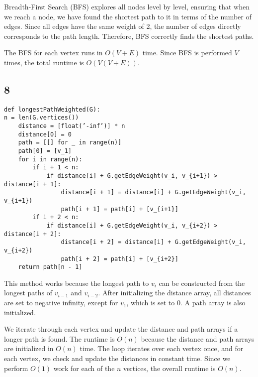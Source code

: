 \documentclass{article}
\begin{document}
Breadth-First Search (BFS) explores all nodes level by level, ensuring that when we reach a node, we have found the shortest path to it in terms of the number of edges. Since all edges have the same weight of 2, the number of edges directly corresponds to the path length. Therefore, BFS correctly finds the shortest paths.

The BFS for each vertex runs in \(O(V + E)\) time. Since BFS is performed \(V\) times, the total runtime is \(O(V(V + E))\).
\pagebreak
\subsection*{8}
\begin{verbatim}
def longestPathWeighted(G):
n = len(G.vertices())
    distance = [float(’-inf’)] * n
    distance[0] = 0
    path = [[] for _ in range(n)]
    path[0] = [v_1]
    for i in range(n):
        if i + 1 < n:
            if distance[i] + G.getEdgeWeight(v_i, v_{i+1}) > distance[i + 1]:
                distance[i + 1] = distance[i] + G.getEdgeWeight(v_i, v_{i+1})
                path[i + 1] = path[i] + [v_{i+1}]
        if i + 2 < n:
            if distance[i] + G.getEdgeWeight(v_i, v_{i+2}) > distance[i + 2]:
                distance[i + 2] = distance[i] + G.getEdgeWeight(v_i, v_{i+2})
                path[i + 2] = path[i] + [v_{i+2}]
    return path[n - 1]
\end{verbatim}
This method works because the longest path to \(v_i\) can be constructed from the longest paths of \(v_{i-1}\) and \(v_{i-2}\). After initializing the distance array, all distances are set to negative infinity, except for \(v_1\), which is set to 0. A path array is also initialized. 

We iterate through each vertex and update the distance and path arrays if a longer path is found. The runtime is \(O(n)\) because the distance and path arrays are initialized in \(O(n)\) time. The loop iterates over each vertex once, and for each vertex, we check and update the distances in constant time. Since we perform \(O(1)\) work for each of the \(n\) vertices, the overall runtime is \(O(n)\).
\end{document}
